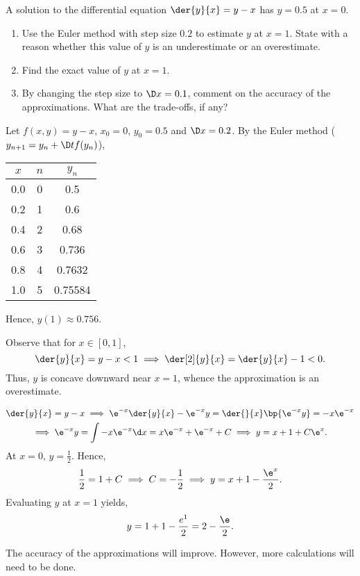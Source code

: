 \begin{problem}
    A solution to the differential equation $\der{y}{x} = y - x$ has $y = 0.5$ at $x = 0$.
    \begin{enumerate}
        \item Use the Euler method with step size $0.2$ to estimate $y$ at $x = 1$. State with a reason whether this value of $y$ is an underestimate or an overestimate.
        \item Find the exact value of $y$ at $x = 1$.
        \item By changing the step size to $\D x = 0.1$, comment on the accuracy of the approximations. What are the trade-offs, if any?
    \end{enumerate}
\end{problem}
\begin{solution}
    \begin{ppart}
        Let $f(x, y) = y - x$, $x_0 = 0$, $y_0 = 0.5$ and $\D x = 0.2$. By the Euler method ($y_{n+1} = y_n + \D t f(y_n)$),

        \begin{center}
            \begin{tabular}{|c|c|c|}
                \hline
                $x$ & $n$ & $y_n$ \\ \hline\hline
                0.0 & 0 & 0.5 \\ \hline
                0.2 & 1 & 0.6 \\ \hline
                0.4 & 2 & 0.68 \\ \hline
                0.6 & 3 & 0.736 \\ \hline
                0.8 & 4 & 0.7632 \\ \hline
                1.0 & 5 & 0.75584 \\ \hline
            \end{tabular}
        \end{center}
        
        Hence, $y(1) \approx 0.756$.
        
        Observe that for $x \in [0, 1]$, \[\der{y}{x} = y - x < 1 \implies \der[2]{y}{x} = \der{y}{x} - 1 < 0.\] Thus, $y$ is concave downward near $x = 1$, whence the approximation is an overestimate.
    \end{ppart}
    \begin{ppart}
        \begin{gather*}
            \der{y}{x} = y - x \implies \e^{-x} \der{y}{x} - \e^{-x}y = \der{}{x} \bp{\e^{-x}y} = -x\e^{-x} \\
            \implies \e^{-x}y = \int -x\e^{-x} \d x = x\e^{-x} + \e^{-x} + C \implies y = x + 1 + C\e^x.
        \end{gather*}
        At $x = 0$, $y = \frac12$. Hence, \[\frac12 = 1 + C \implies C = -\frac12 \implies y = x + 1 - \frac{\e^x}2.\] Evaluating $y$ at $x = 1$ yields, \[y = 1 + 1 - \frac{e^1}2 = 2 - \frac{\e}2.\]
    \end{ppart}
    \begin{ppart}
        The accuracy of the approximations will improve. However, more calculations will need to be done.
    \end{ppart}
\end{solution}

